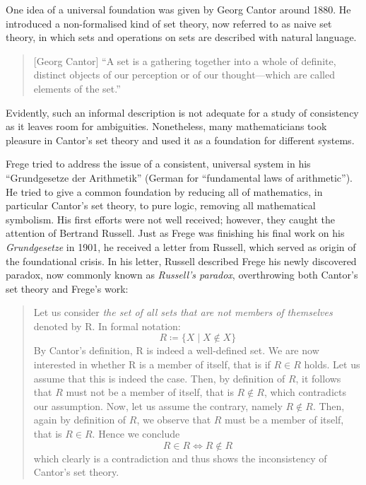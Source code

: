 \documentclass{article}
\begin{document}
One idea of a universal foundation was given by Georg Cantor around 1880. He introduced a non-formalised kind of set theory, now referred to as naive set theory, in which sets and operations on sets are described with natural language. 
\begin{quote}[Georg Cantor]
``A set is a gathering together into a whole of definite, distinct objects of our perception or of our thought---which are called elements of the set.''\cite{cantor_set}
\end{quote}
Evidently, such an informal description is not adequate for a study of consistency as it leaves room for ambiguities. Nonetheless, many mathematicians took pleasure in Cantor's set theory and used it as a foundation for different systems.

Frege tried to address the issue of a consistent, universal system in his ``Grundgesetze der Arithmetik'' (German for ``fundamental laws of arithmetic''). He tried to give a common foundation by reducing all of mathematics, in particular Cantor's set theory, to pure logic, removing all mathematical symbolism. His first efforts were not well received; however, they caught the attention of Bertrand Russell. Just as Frege was finishing his final work on his \textit{Grundgesetze} in 1901, he received a letter from Russell, which served as origin of the foundational crisis. In his letter, Russell described Frege his newly discovered paradox, now commonly known as \textit{Russell's paradox}, overthrowing both Cantor's set theory and Frege's work:
\begin{quote}
Let us consider \textit{the set of all sets that are not members of themselves} denoted by R. In formal notation:
\begin{equation*}
	R\coloneqq\{X\mid X\notin X\}
\end{equation*}
By Cantor's definition, R is indeed a well-defined set.
We are now interested in whether R is a member of itself, that is if $R\in R$ holds.
Let us assume that this is indeed the case. Then, by definition of $R$, it follows that $R$ must not be a member of itself, that is $R\notin R$, which contradicts our assumption. Now, let us assume the contrary, namely $R\notin R$. Then, again by definition of $R$, we observe that $R$ must be a member of itself, that is $R\in R$. Hence we conclude
\begin{equation*}
		R\in R\iff R\notin R
\end{equation*}
which clearly is a contradiction and thus shows the inconsistency of Cantor's set theory.
\end{quote}
\end{document}
